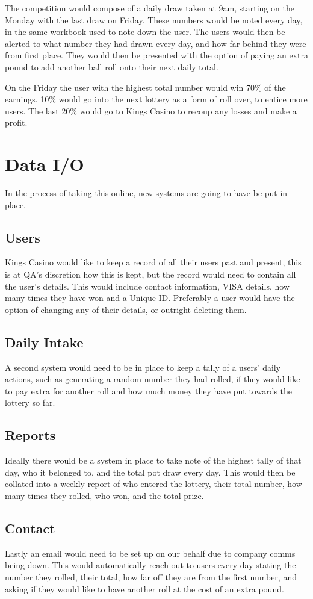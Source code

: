 \documentclass[12]{article}
\begin{document}
The competition would compose of a daily draw taken at 9am, starting on the Monday with the last draw on Friday. These numbers would be noted every day, in the same workbook used to note down the user. The users would then be alerted to what number they had drawn every day, and how far behind they were from first place. They would then be presented with the option of paying an extra pound to add another ball roll onto their next daily total.

On the Friday the user with the highest total number would win 70\% of the earnings. 10\% would go into the next lottery as a form of roll over, to entice more users. The last 20\% would go to Kings Casino to recoup any losses and make a profit.

\section{Data I/O}

In the process of taking this online, new systems are going to have be put in place.

\subsection{Users}

Kings Casino would like to keep a record of all their users past and present, this is at QA’s discretion how this is kept, but the record would need to contain all the user’s details. This would include contact information, VISA details, how many times they have won and a Unique ID. Preferably a user would have the option of changing any of their details, or outright deleting them.

\subsection{Daily Intake}

A second system would need to be in place to keep a tally of a users’ daily actions, such as generating a random number they had rolled, if they would like to pay extra for another roll and how much money they have put towards the lottery so far.

\subsection{Reports}

Ideally there would be a system in place to take note of the highest tally of that day, who it belonged to, and the total pot draw every day. This would then be collated into a weekly report of who entered the lottery, their total number, how many times they rolled, who won, and the total prize.

\subsection{Contact}

Lastly an email would need to be set up on our behalf due to company comms being down. This would automatically reach out to users every day stating the number they rolled, their total, how far off they are from the first number, and asking if they would like to have another roll at the cost of an extra pound.
\end{document}
